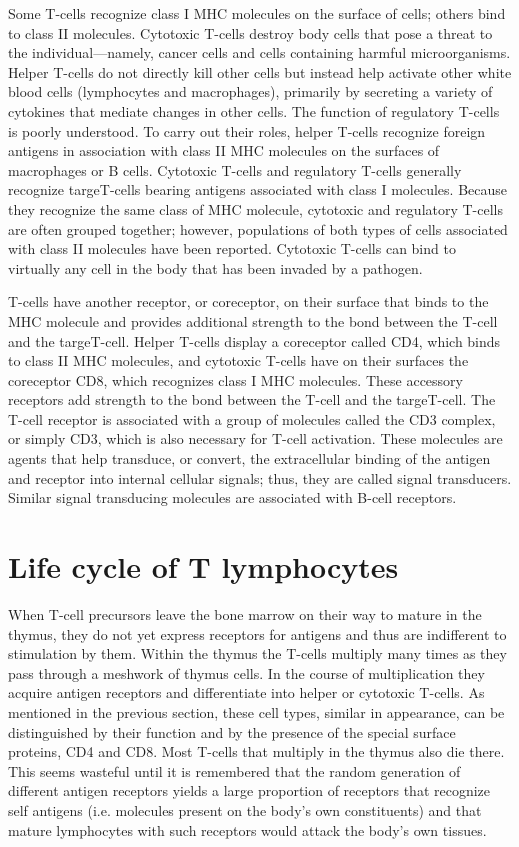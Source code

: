 Some T-cells recognize class I MHC molecules on the surface of cells; others bind to class II molecules. Cytotoxic T-cells destroy body cells that pose a threat to the individual—namely, cancer cells and cells containing harmful microorganisms. Helper T-cells do not directly kill other cells but instead help activate other white blood cells (lymphocytes and macrophages), primarily by secreting a variety of cytokines that mediate changes in other cells. The function of regulatory T-cells is poorly understood. To carry out their roles, helper T-cells recognize foreign antigens in association with class II MHC molecules on the surfaces of macrophages or B cells. Cytotoxic T-cells and regulatory T-cells generally recognize targeT-cells bearing antigens associated with class I molecules. Because they recognize the same class of MHC molecule, cytotoxic and regulatory T-cells are often grouped together; however, populations of both types of cells associated with class II molecules have been reported. Cytotoxic T-cells can bind to virtually any cell in the body that has been invaded by a pathogen.

T-cells have another receptor, or coreceptor, on their surface that binds to the MHC molecule and provides additional strength to the bond between the T-cell and the targeT-cell. Helper T-cells display a coreceptor called CD4, which binds to class II MHC molecules, and cytotoxic T-cells have on their surfaces the coreceptor CD8, which recognizes class I MHC molecules. These accessory receptors add strength to the bond between the T-cell and the targeT-cell.
The T-cell receptor is associated with a group of molecules called the CD3 complex, or simply CD3, which is also necessary for T-cell activation. These molecules are agents that help transduce, or convert, the extracellular binding of the antigen and receptor into internal cellular signals; thus, they are called signal transducers. Similar signal transducing molecules are associated with B-cell receptors.

\section{Life cycle of T lymphocytes}
When T-cell precursors leave the bone marrow on their way to mature in the thymus, they do not yet express receptors for antigens and thus are indifferent to stimulation by them. Within the thymus the T-cells multiply many times as they pass through a meshwork of thymus cells. In the course of multiplication they acquire antigen receptors and differentiate into helper or cytotoxic T-cells. As mentioned in the previous section, these cell types, similar in appearance, can be distinguished by their function and by the presence of the special surface proteins, CD4 and CD8. Most T-cells that multiply in the thymus also die there. This seems wasteful until it is remembered that the random generation of different antigen receptors yields a large proportion of receptors that recognize self antigens (i.e. molecules present on the body's own constituents) and that mature lymphocytes with such receptors would attack the body’s own tissues.

